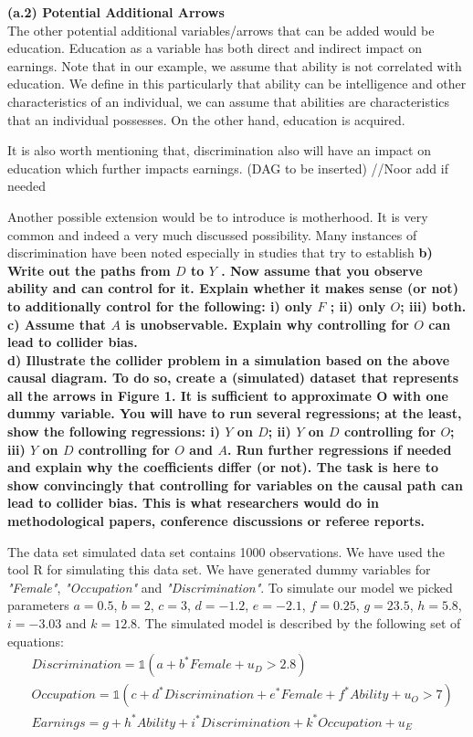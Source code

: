 \documentclass[a4paper,12pt,oneside,English]{article}
\begin{document}
\textbf{(a.2) Potential Additional Arrows}\\
The other potential additional variables/arrows that can be added would be education. Education as a variable has both direct and indirect impact on earnings. Note that in our example, we assume that ability is not correlated with education. We define in this particularly that ability can be intelligence and other characteristics of an individual, we can assume that abilities are characteristics that an individual possesses. On the other hand, education is acquired.

It is also worth mentioning that, discrimination also will have an impact on education which further impacts earnings. (DAG to be inserted) //Noor add if needed

Another possible extension would be to introduce is motherhood. It is very common and indeed a very much discussed possibility. Many instances of discrimination have been noted especially in studies that try to establish 
\textbf{b) Write out the paths from $D$ to $Y$ . Now assume that you observe ability and can control for it. Explain whether it makes sense (or not) to additionally control for the following: i) only $F$ ; ii) only $O$; iii) both.}\\
\textbf{c) Assume that $A$ is unobservable. Explain why controlling for $O$ can lead to collider bias.}\\
\textbf{d) Illustrate the collider problem in a simulation based on the above causal diagram. To do so, create a (simulated) dataset that represents all the arrows in Figure 1. It is sufficient to approximate O with one dummy variable. You will have to run several regressions; at the least, show the following regressions: i) $Y$ on $D$; ii) $Y$ on $D$ controlling for $O$; iii) $Y$ on $D$ controlling for $O$ and $A$. Run further regressions if needed and explain why the coefficients differ (or not). The task is here to show convincingly that controlling for variables on the causal path can lead to collider bias. This is what researchers would do in methodological papers, conference discussions or referee reports.}

The data set simulated data set contains 1000 observations. We have used the tool R for simulating this data set. We have generated dummy variables for \textit{"Female"}, \textit{"Occupation"} and \textit{"Discrimination"}. To simulate our model we picked parameters $a=0.5$, $b=2$, $c=3$, $d=-1.2$, $e=-2.1$, $f=0.25$, $g=23.5$, $h=5.8$, $i=-3.03$ and $k=12.8$. The simulated model is described by the following set of equations:
\begin{equation}
    \begin{split}
        &Discrimination=\mathds{1}(a+b^*Female+u_D>2.8)\\
        &Occupation=\mathds{1}(c+d^*Discrimination+e^*Female+f^*Ability+u_O>7)\\
        &Earnings=g+h^*Ability+i^*Discrimination+k^*Occupation+u_E
    \end{split}
\end{equation}
\end{document}
